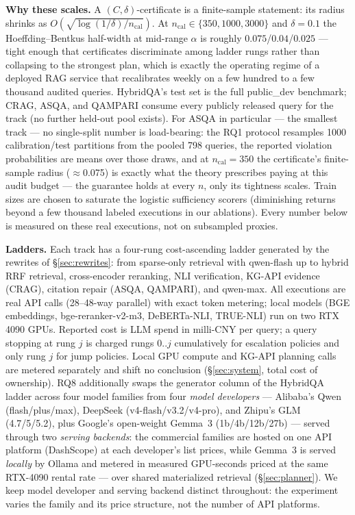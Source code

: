 \textbf{Why these scales.} A $(C,\delta)$-certificate is a finite-sample
statement: its radius shrinks as $O(\sqrt{\log(1/\delta)/n_{\mathrm{cal}}})$.
At $n_{\mathrm{cal}}\!\in\!\{350,1000,3000\}$ and $\delta{=}0.1$ the
Hoeffding--Bentkus half-width at mid-range $\alpha$ is roughly
$0.075$/$0.04$/$0.025$ --- tight enough that certificates discriminate
among ladder rungs rather than collapsing to the strongest plan, which is
exactly the operating regime of a deployed RAG service that recalibrates
weekly on a few hundred to a few thousand audited queries. HybridQA's
test set is the full public\_dev benchmark; CRAG, ASQA, and QAMPARI
consume every publicly released query for the track (no further held-out
pool exists).
For ASQA in particular --- the smallest track --- no single-split number
is load-bearing: the RQ1 protocol resamples 1000 calibration/test
partitions from the pooled 798 queries, the reported violation
probabilities are means over those draws, and at $n_{\mathrm{cal}}=350$
the certificate's finite-sample radius ($\approx$0.075) is exactly what
the theory prescribes paying at this audit budget --- the guarantee holds
at every $n$, only its tightness scales.
Train sizes are chosen to saturate the logistic sufficiency scorers
(diminishing returns beyond a few thousand labeled executions in our
ablations). Every number below is measured on these real executions, not
on subsampled proxies.

\textbf{Ladders.} Each track has a four-rung cost-ascending ladder
generated by the rewrites of \S\ref{sec:rewrites}: from sparse-only
retrieval with qwen-flash up to hybrid RRF retrieval, cross-encoder
reranking, NLI verification, KG-API evidence (CRAG), citation repair
(ASQA, QAMPARI), and qwen-max. All executions are real API calls (28--48-way
parallel) with exact token metering; local models (BGE embeddings,
bge-reranker-v2-m3, DeBERTa-NLI, TRUE-NLI) run on two RTX 4090 GPUs.
Reported cost is LLM spend in milli-CNY per query; a query stopping at rung
$j$ is charged rungs $0..j$ cumulatively for escalation policies and only
rung $j$ for jump policies. Local GPU compute and KG-API planning calls
are metered separately and shift no conclusion
(\S\ref{sec:system}, total cost of ownership). RQ8 additionally swaps the
generator column of the HybridQA ladder across four model families from
four \emph{model developers} --- Alibaba's Qwen (flash/plus/max),
DeepSeek (v4-flash/v3.2/v4-pro), and Zhipu's GLM (4.7/5/5.2), plus
Google's open-weight Gemma~3 (1b/4b/12b/27b) --- served through two
\emph{serving backends}: the commercial families are hosted on one API
platform (DashScope) at each developer's list prices, while Gemma~3 is
served \emph{locally} by Ollama and metered in measured GPU-seconds
priced at the same RTX-4090 rental rate --- over shared materialized
retrieval (\S\ref{sec:planner}). We keep model developer and serving
backend distinct throughout: the experiment varies the family and its
price structure, not the number of API platforms.

